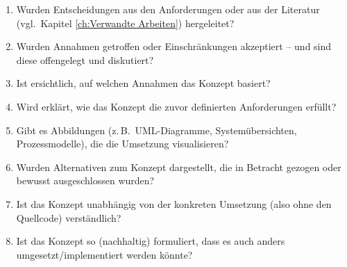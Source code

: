 {\begin{enumerate}
    \item Wurden Entscheidungen aus den Anforderungen oder aus der Literatur (vgl.~Kapitel \ref{ch:Verwandte Arbeiten}) hergeleitet?
    \item Wurden Annahmen getroffen oder Einschränkungen akzeptiert – und sind diese offengelegt und diskutiert?
    \item Ist ersichtlich, auf welchen Annahmen das Konzept basiert?
    \item Wird erklärt, wie das Konzept die zuvor definierten Anforderungen erfüllt?
    \item Gibt es Abbildungen (z.\,B.~UML-Diagramme, Systemübersichten, Prozessmodelle), die die Umsetzung visualisieren?
    \item Wurden Alternativen zum Konzept dargestellt, die in Betracht gezogen oder bewusst ausgeschlossen wurden?
    \item Ist das Konzept unabhängig von der konkreten Umsetzung (also ohne den Quellcode) verständlich?
    \item Ist das Konzept so (nachhaltig) formuliert, dass es auch anders umgesetzt/implementiert werden könnte?
\end{enumerate}
}